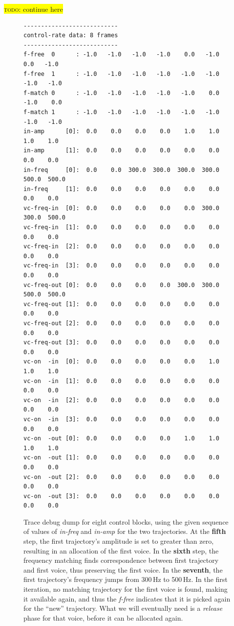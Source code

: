 \documentclass[11pt,a4paper]{article}
\newcommand{\todo}[1]{\colorbox{yellow}{\textsc{todo}: #1}}
\begin{document}
\todo{continue here}

\begin{figure}
\begin{lstlisting}[style=plain]
---------------------------
control-rate data: 8 frames
---------------------------
f-free  0      : -1.0   -1.0   -1.0   -1.0    0.0   -1.0    0.0   -1.0    
f-free  1      : -1.0   -1.0   -1.0   -1.0   -1.0   -1.0   -1.0   -1.0    
f-match 0      : -1.0   -1.0   -1.0   -1.0   -1.0    0.0   -1.0    0.0    
f-match 1      : -1.0   -1.0   -1.0   -1.0   -1.0   -1.0   -1.0   -1.0    
in-amp      [0]:  0.0    0.0    0.0    0.0    1.0    1.0    1.0    1.0    
in-amp      [1]:  0.0    0.0    0.0    0.0    0.0    0.0    0.0    0.0    
in-freq     [0]:  0.0    0.0  300.0  300.0  300.0  300.0  500.0  500.0    
in-freq     [1]:  0.0    0.0    0.0    0.0    0.0    0.0    0.0    0.0    
vc-freq-in  [0]:  0.0    0.0    0.0    0.0    0.0  300.0  300.0  500.0    
vc-freq-in  [1]:  0.0    0.0    0.0    0.0    0.0    0.0    0.0    0.0    
vc-freq-in  [2]:  0.0    0.0    0.0    0.0    0.0    0.0    0.0    0.0    
vc-freq-in  [3]:  0.0    0.0    0.0    0.0    0.0    0.0    0.0    0.0    
vc-freq-out [0]:  0.0    0.0    0.0    0.0  300.0  300.0  500.0  500.0    
vc-freq-out [1]:  0.0    0.0    0.0    0.0    0.0    0.0    0.0    0.0    
vc-freq-out [2]:  0.0    0.0    0.0    0.0    0.0    0.0    0.0    0.0    
vc-freq-out [3]:  0.0    0.0    0.0    0.0    0.0    0.0    0.0    0.0    
vc-on  -in  [0]:  0.0    0.0    0.0    0.0    0.0    1.0    1.0    1.0    
vc-on  -in  [1]:  0.0    0.0    0.0    0.0    0.0    0.0    0.0    0.0    
vc-on  -in  [2]:  0.0    0.0    0.0    0.0    0.0    0.0    0.0    0.0    
vc-on  -in  [3]:  0.0    0.0    0.0    0.0    0.0    0.0    0.0    0.0    
vc-on  -out [0]:  0.0    0.0    0.0    0.0    1.0    1.0    1.0    1.0    
vc-on  -out [1]:  0.0    0.0    0.0    0.0    0.0    0.0    0.0    0.0    
vc-on  -out [2]:  0.0    0.0    0.0    0.0    0.0    0.0    0.0    0.0    
vc-on  -out [3]:  0.0    0.0    0.0    0.0    0.0    0.0    0.0    0.0    
\end{lstlisting}%
\caption{Trace debug dump for eight control blocks, using the given sequence of values of \emph{in-freq} and \emph{in-amp} for the two trajectories. At the \textbf{fifth} step, the first trajectory's amplitude is set to greater than zero, resulting in an allocation of the first voice. In the \textbf{sixth} step, the frequency matching finds correspondence between first trajectory and first voice, thus preserving the first voice. In the \textbf{seventh}, the first trajectory's frequency jumps from 300\,Hz to 500\,Hz. In the first iteration, no matching trajectory for the first voice is found, making it available again, and thus the \emph{f-free} indicates that it is picked again for the ``new'' trajectory. What we will eventually need is a \emph{release} phase for that voice, before it can be allocated again.}%
\label{fig:trace-dump-voices}%
\end{figure}
\end{document}
